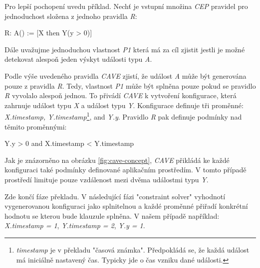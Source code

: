 \documentclass[
  digital, %
  table,   %
  nolof,     %
  nolot,     %
  oneside, %
  nocover,
  monochrome,
  12pt
]{fithesis3}
\begin{document}
Pro lepší pochopení uvedu příklad. Nechť je vstupní množina \textit{CEP} pravidel pro jednoduchost složena z jednoho pravidla \textit{R}:

\begin{center}
\begin{minipage}[H]{.5\linewidth}
	\begin{mylisting}
R:
A() := [X then Y(y > 0)]
	\end{mylisting}
	\label{fig:cave-event-example-1} 
\end{minipage}
\end{center}

Dále uvažujme jednoduchou vlastnost \textit{P1} která má za cíl zjistit jestli je možné detekovat alespoň jeden výskyt události typu \textit{A}.

Podle výše uvedeného pravidla \textit{CAVE} zjistí, že událost \textit{A} může být generována pouze z pravidla \textit{R}. Tedy, vlastnost \textit{P1} může být splněna pouze pokud se pravidlo \textit{R} vyvolalo alespoň jednou. To přivádí \textit{CAVE} k vytvoření konfigurace, která zahrnuje událost typu \textit{X} a událost typu \textit{Y}. Konfigurace definuje tři proměnné: \textit{X.timestamp, Y.timestamp}\footnote{\textit{timestamp} je v překladu "časová známka". Předpokládá se, že každá událost má iniciálně nastavený čas. Typicky jde o čas vzniku dané události.}, and \textit{Y.y}. Pravidlo \textit{R} pak definuje podmínky nad těmito proměnnými:

\begin{center}
\begin{minipage}[H]{.7\linewidth}
	\begin{mylisting}
Y.y > 0 and X.timestamp < Y.timestamp
	\end{mylisting}
	\label{fig:cave-event-example-1} 
\end{minipage}
\end{center}

Jak je znázorněno na obrázku \ref{fig:cave-concept}, \textit{CAVE} přikládá ke každé konfiguraci také podmínky definované aplikačním prostředím. V tomto případě prostředí limituje pouze vzdálenost mezi dvěma událostmi typu \textit{Y}.

Zde končí fáze překladu. V následující fázi "constraint solver" vyhodnotí vygenerovanou konfiguraci jako splnitelnou a každé proměnné přiřadí konkrétní hodnotu se kterou bude klauzule splněna. V našem případě například: \textit{X.timestamp = 1}, \textit{Y.timestamp = 2}, \textit{Y.y = 1}.
\end{document}
